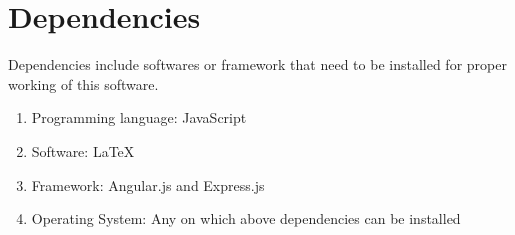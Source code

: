 \section{Dependencies}
Dependencies include softwares or framework that need to be installed for 
proper working of this software.

\begin{enumerate} 
\item Programming language: JavaScript
\item Software: \LaTeX{}
\item Framework: Angular.js and Express.js
\item Operating System: Any on which above dependencies can be installed
\end{enumerate}

